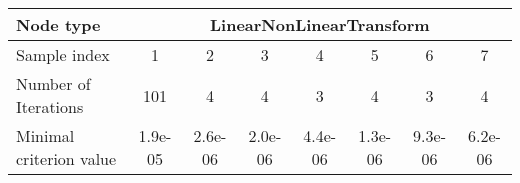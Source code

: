 \begin{tabular}{l|ccccccc|}
Node type & \multicolumn{7}{c}{LinearNonLinearTransform} \\
\hline
Sample index & 1 & 2 & 3 & 4 & 5 & 6 & 7 \\
Number of Iterations & 101 & 4 & 4 & 3 & 4 & 3 & 4 \\
Minimal criterion value & 1.9e-05 & 2.6e-06 & 2.0e-06 & 4.4e-06 & 1.3e-06 & 9.3e-06 & 6.2e-06 \\
\hline
\end{tabular}
